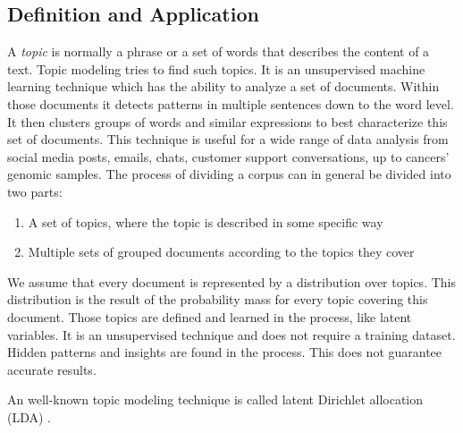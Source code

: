 \subsection{Definition and Application}
A \textit{topic} is normally a phrase or a set of words that describes the content of a text. Topic modeling tries to find such topics. It is an unsupervised machine learning technique which has the ability to analyze a set of documents. Within those documents it detects patterns in multiple sentences down to the word level. It then clusters groups of words and similar expressions to best characterize this set of documents. This technique is useful for a wide range of data analysis from social media posts, emails, chats, customer support conversations, up to cancers' genomic samples. The process of dividing a corpus can in general be divided into two parts:
\begin{enumerate}
    \item A set of topics, where the topic is described in some specific way
    \item Multiple sets of grouped documents according to the topics they cover
\end{enumerate}
We assume that every document is represented by a distribution over topics. This distribution is the result of the probability mass for every topic covering this document. Those topics are defined and learned in the process, like latent variables. It is an unsupervised technique and does not require a training dataset. Hidden patterns and insights are found in the process. This does not guarantee accurate results. \cite{tmint} 

An well-known topic modeling technique is called latent Dirichlet allocation (LDA) \cite{blei2003latent}. 

